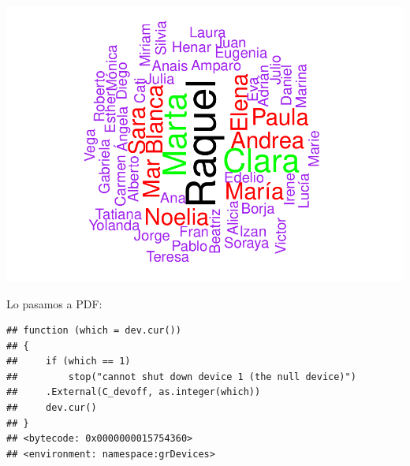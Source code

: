 \documentclass[]{article}
\newenvironment{Shaded}{\begin{snugshade}}{\end{snugshade}}
\newcommand{\KeywordTok}[1]{\textcolor[rgb]{0.13,0.29,0.53}{\textbf{#1}}}
\newcommand{\DataTypeTok}[1]{\textcolor[rgb]{0.13,0.29,0.53}{#1}}
\newcommand{\DecValTok}[1]{\textcolor[rgb]{0.00,0.00,0.81}{#1}}
\newcommand{\FloatTok}[1]{\textcolor[rgb]{0.00,0.00,0.81}{#1}}
\newcommand{\StringTok}[1]{\textcolor[rgb]{0.31,0.60,0.02}{#1}}
\newcommand{\OtherTok}[1]{\textcolor[rgb]{0.56,0.35,0.01}{#1}}
\newcommand{\OperatorTok}[1]{\textcolor[rgb]{0.81,0.36,0.00}{\textbf{#1}}}
\newcommand{\NormalTok}[1]{#1}
\begin{document}
\includegraphics{codigo_files/figure-latex/wordcloud-1.pdf}

Lo pasamos a PDF:

\begin{Shaded}
\end{Shaded}

\begin{verbatim}
## function (which = dev.cur()) 
## {
##     if (which == 1) 
##         stop("cannot shut down device 1 (the null device)")
##     .External(C_devoff, as.integer(which))
##     dev.cur()
## }
## <bytecode: 0x0000000015754360>
## <environment: namespace:grDevices>
\end{verbatim}
\end{document}
